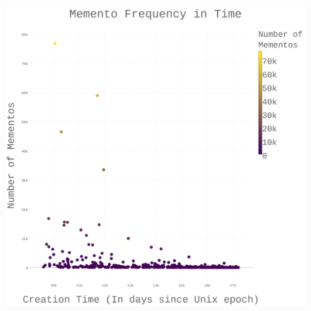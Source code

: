 \documentclass[12pt, a4paper]{article}
\begin{document}
\begin{figure}[h]
    \centering
    \href{http://datenstrom.gitlab.io/cs532-s17/notebooks/scatter.html}{
    \includegraphics[width=\textwidth]{dia/scatter.png}
    }
\end{figure}
\end{document}
